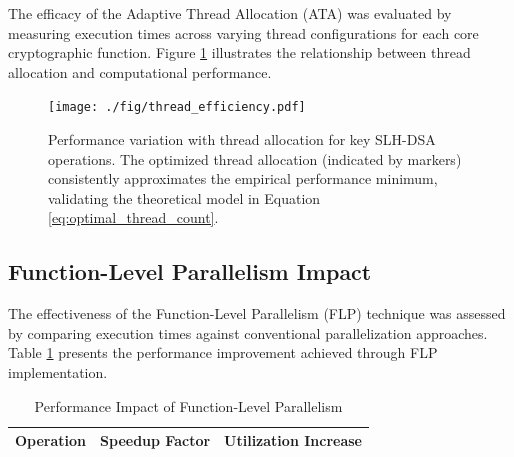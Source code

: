 \documentclass[journal]{IEEEtran}
\begin{document}
The efficacy of the Adaptive Thread Allocation (ATA) was evaluated by measuring execution times across varying thread configurations for each core cryptographic function. Figure \ref{fig:thread_efficiency} illustrates the relationship between thread allocation and computational performance.

\begin{figure}[htbp]
  \centering
  \texttt{[image: ./fig/thread\_efficiency.pdf]}
  \caption{Performance variation with thread allocation for key SLH-DSA operations. The optimized thread allocation (indicated by markers) consistently approximates the empirical performance minimum, validating the theoretical model in Equation \ref{eq:optimal_thread_count}.}
  \label{fig:thread_efficiency}
\end{figure}



\subsection{Function-Level Parallelism Impact}

The effectiveness of the Function-Level Parallelism (FLP) technique was assessed by comparing execution times against conventional parallelization approaches. Table \ref{tab:flp_impact} presents the performance improvement achieved through FLP implementation.

\begin{table}[h]
\centering
\caption{Performance Impact of Function-Level Parallelism}
\label{tab:flp_impact}
\begin{tabular}{@{}lcc@{}}
\toprule
\textbf{Operation} & \textbf{Speedup Factor} & \textbf{Utilization Increase} \\
\midrule
\bottomrule
\end{tabular}
\end{table}
\end{document}
